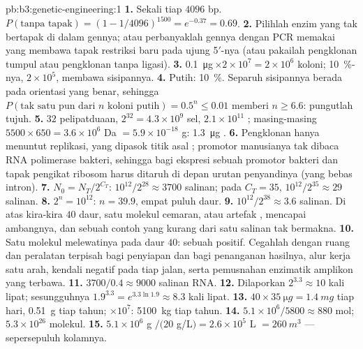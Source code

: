 \begin{solution}{pb:b3:genetic-engineering:1}
\textbf{1.} Sekali tiap $4096$ bp. $P(\text{tanpa tapak}) = (1 - 1/4096)^{1500}
= e^{-0.37} = 0.69$.
\textbf{2.} Pilihlah enzim yang tak bertapak di dalam gennya; atau
perbanyaklah gennya dengan PCR memakai  yang membawa tapak restriksi
baru pada ujung 5$'$-nya (atau pakailah pengklonan tumpul atau pengklonan tanpa ligasi).
\textbf{3.} \qty{0.1}{\micro g}\,$\times 2\times 10^{7} = 2\times
10^{6}$ koloni; \qty{10}{\%}-nya, $2\times 10^{5}$, membawa sisipannya.
\textbf{4.} Putih: \qty{10}{\%}. Separuh sisipannya berada pada orientasi
yang benar, sehingga $P(\text{tak satu pun dari } n \text{ koloni putih}) = 0.5^{n} \le 0.01$
memberi $n \ge 6.6$: pungutlah tujuh.
\textbf{5.} $32$ pelipatduaan, $2^{32} = 4.3\times 10^{9}$ sel, $2.1\times
10^{11}$ ; masing-masing $5500\times 650 = 3.6\times 10^{6}$ Da $=
5.9\times 10^{-18}$ g: \qty{1.3}{\micro g} .
\textbf{6.} Pengklonan hanya menuntut replikasi, yang dipasok titik asal
; promotor manusianya tak dibaca RNA polimerase bakteri, sehingga
bagi ekspresi sebuah promotor bakteri dan tapak pengikat ribosom harus
ditaruh di depan urutan penyandinya (yang bebas intron).
\textbf{7.} $N_{0} = N_{T}/2^{C_{T}}$: $10^{12}/2^{28} \approx 3700$
salinan; pada $C_{T} = 35$, $10^{12}/2^{35} \approx 29$ salinan.
\textbf{8.} $2^{n} = 10^{12}$: $n = 39.9$, empat puluh daur.
\textbf{9.} $10^{12}/2^{38} \approx 3.6$ salinan. Di atas kira-kira $40$
daur, satu molekul cemaran, atau artefak , mencapai
ambangnya, dan sebuah contoh yang kurang dari satu salinan tak bermakna.
\textbf{10.} Satu molekul melewatinya pada daur $40$: sebuah positif. Cegahlah
dengan ruang dan peralatan terpisah bagi penyiapan dan bagi penanganan
hasilnya, alur kerja satu arah, kendali negatif pada tiap jalan, serta
pemusnahan enzimatik amplikon yang terbawa.
\textbf{11.} $3700/0.4 \approx 9000$ salinan RNA.
\textbf{12.} Dilaporkan $2^{3.3} \approx 10$ kali lipat; sesungguhnya $1.9^{3.3} =
e^{3.3\ln 1.9} \approx 8.3$ kali lipat.
\textbf{13.} $40\times \qty{35}{\micro g} = \qty{1.4}{mg}$ tiap hari,
\qty{0.51}{g} tiap tahun; $\times 10^{7}$: \qty{5100}{kg} tiap tahun.
\textbf{14.} $5.1\times 10^{6}/5800 \approx 880$ mol; $5.3\times 10^{26}$
molekul.
\textbf{15.} $5.1\times 10^{6}$ g $/ (20$ g/L$) = 2.6\times 10^{5}$ L
$= \qty{260}{m^3}$ --- sepersepuluh kolamnya.

\end{solution}
